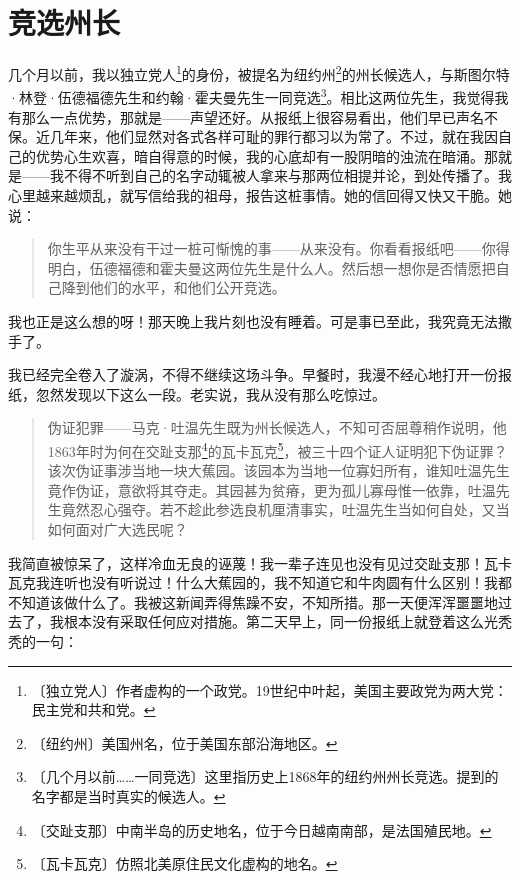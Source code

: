 \documentclass[12pt,UTF-8,openany]{ctexbook}
\begin{document}
\chapter{竞选州长}

\begin{normalsize}
    
    几个月以前，我以独立党人\footnote{〔独立党人〕作者虚构的一个政党。19世纪中叶起，美国主要政党为两大党：民主党和共和党。}的身份，被提名为纽约州\footnote{〔纽约州〕美国州名，位于美国东部沿海地区。}的州长候选人，与斯图尔特·林登·伍德福德先生和约翰·霍夫曼先生一同竞选\footnote{〔几个月以前……一同竞选〕这里指历史上1868年的纽约州州长竞选。提到的名字都是当时真实的候选人。}。相比这两位先生，我觉得我有那么一点优势，那就是——声望还好。从报纸上很容易看出，他们早已声名不保。近几年来，他们显然对各式各样可耻的罪行都习以为常了。不过，就在我因自己的优势心生欢喜，暗自得意的时候，我的心底却有一股阴暗的浊流在暗涌。那就是——我不得不听到自己的名字动辄被人拿来与那两位相提并论，到处传播了。我心里越来越烦乱，就写信给我的祖母，报告这桩事情。她的信回得又快又干脆。她说：
    
    \begin{quotation}
    
    你生平从来没有干过一桩可惭愧的事——从来没有。你看看报纸吧——你得明白，伍德福德和霍夫曼这两位先生是什么人。然后想一想你是否情愿把自己降到他们的水平，和他们公开竞选。
    
    \end{quotation}
    
    我也正是这么想的呀！那天晚上我片刻也没有睡着。可是事已至此，我究竟无法撒手了。
    
    我已经完全卷入了漩涡，不得不继续这场斗争。早餐时，我漫不经心地打开一份报纸，忽然发现以下这么一段。老实说，我从没有那么吃惊过。
    
    \begin{quotation}
    
    伪证犯罪——马克·吐温先生既为州长候选人，不知可否屈尊稍作说明，他1863年时为何在交趾支那\footnote{〔交趾支那〕中南半岛的历史地名，位于今日越南南部，是法国殖民地。}的瓦卡瓦克\footnote{〔瓦卡瓦克〕仿照北美原住民文化虚构的地名。}，被三十四个证人证明犯下伪证罪？该次伪证事涉当地一块大蕉园。该园本为当地一位寡妇所有，谁知吐温先生竟作伪证，意欲将其夺走。其园甚为贫瘠，更为孤儿寡母惟一依靠，吐温先生竟然忍心强夺。若不趁此参选良机厘清事实，吐温先生当如何自处，又当如何面对广大选民呢？
    
    \end{quotation}
    
    我简直被惊呆了，这样冷血无良的诬蔑！我一辈子连见也没有见过交趾支那！瓦卡瓦克我连听也没有听说过！什么大蕉园的，我不知道它和牛肉圆有什么区别！我都不知道该做什么了。我被这新闻弄得焦躁不安，不知所措。那一天便浑浑噩噩地过去了，我根本没有采取任何应对措施。第二天早上，同一份报纸上就登着这么光秃秃的一句：
    

\end{normalsize}
\end{document}
